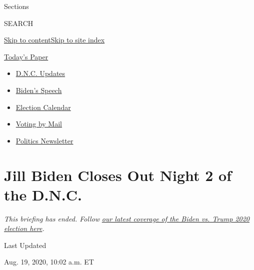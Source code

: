 Sections

SEARCH

\protect\hyperlink{site-content}{Skip to
content}\protect\hyperlink{site-index}{Skip to site index}

\href{https://myaccount.nytimes3xbfgragh.onion/auth/login?response_type=cookie\&client_id=vi}{}

\href{https://www.nytimes3xbfgragh.onion/section/todayspaper}{Today's
Paper}

\begin{itemize}
\item
  \href{https://www.nytimes3xbfgragh.onion/live/2020/08/21/us/dnc-convention-election?action=click\&pgtype=Article\&state=default\&region=TOP_BANNER\&context=storylines_menu}{D.N.C.
  Updates}
\item
  \href{https://www.nytimes3xbfgragh.onion/2020/08/20/us/politics/biden-presidential-nomination-dnc.html?action=click\&pgtype=Article\&state=default\&region=TOP_BANNER\&context=storylines_menu}{Biden's
  Speech}
\item
  \href{https://www.nytimes3xbfgragh.onion/interactive/2019/us/elections/2020-presidential-election-calendar.html?action=click\&pgtype=Article\&state=default\&region=TOP_BANNER\&context=storylines_menu}{Election
  Calendar}
\item
  \href{https://www.nytimes3xbfgragh.onion/interactive/2020/08/11/us/politics/vote-by-mail-us-states.html?action=click\&pgtype=Article\&state=default\&region=TOP_BANNER\&context=storylines_menu}{Voting
  by Mail}
\item
  \href{https://www.nytimes3xbfgragh.onion/newsletters/politics?action=click\&pgtype=Article\&state=default\&region=TOP_BANNER\&context=storylines_menu}{Politics
  Newsletter}
\end{itemize}

\hypertarget{jill-biden-closes-out-night-2-of-the-dnc}{%
\section{Jill Biden Closes Out Night 2 of the
D.N.C.}\label{jill-biden-closes-out-night-2-of-the-dnc}}

\emph{This briefing has ended. Follow}
\href{https://www.nytimes3xbfgragh.onion/live/2020/08/19/us/dnc-convention-election}{\emph{our
latest coverage of the Biden vs. Trump 2020 election here}}\emph{.}

Last Updated

Aug. 19, 2020, 10:02 a.m. ET


